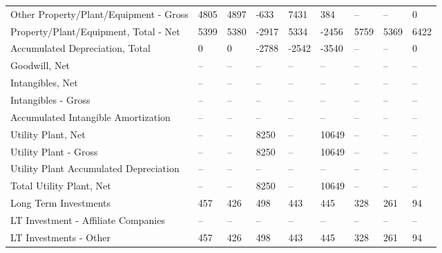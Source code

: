 \documentclass[grad,numbers]{coppe}
\begin{document}
\begin{longtable}[t]{lllllllll}
  \hspace{1em}\hspace{1em}Other Property/Plant/Equipment - Gross & 4805 & 4897 & -633 & 7431 & 384 & -- & -- & 0\\
  \hspace{1em}Property/Plant/Equipment, Total - Net & 5399 & 5380 & -2917 & 5334 & -2456 & 5759 & 5369 & 6422\\
  \hspace{1em}\hspace{1em}Accumulated Depreciation, Total & 0 & 0 & -2788 & -2542 & -3540 & -- & -- & 0\\
  \hspace{1em}Goodwill, Net & -- & -- & -- & -- & -- & -- & -- & --\\
  \hspace{1em}Intangibles, Net & -- & -- & -- & -- & -- & -- & -- & --\\
  \hspace{1em}\hspace{1em}Intangibles - Gross & -- & -- & -- & -- & -- & -- & -- & --\\
  \hspace{1em}\hspace{1em}Accumulated Intangible Amortization & -- & -- & -- & -- & -- & -- & -- & --\\
  \hspace{1em}Utility Plant, Net & -- & -- & 8250 & -- & 10649 & -- & -- & --\\
  \hspace{1em}\hspace{1em}Utility Plant - Gross & -- & -- & 8250 & -- & 10649 & -- & -- & --\\
  \hspace{1em}\hspace{1em}Utility Plant Accumulated Depreciation & -- & -- & -- & -- & -- & -- & -- & --\\
  \hspace{1em}Total Utility Plant, Net & -- & -- & 8250 & -- & 10649 & -- & -- & --\\
  \hspace{1em}Long Term Investments & 457 & 426 & 498 & 443 & 445 & 328 & 261 & 94\\
  \hspace{1em}\hspace{1em}LT Investment - Affiliate Companies & -- & -- & -- & -- & -- & -- & -- & --\\
  \hspace{1em}\hspace{1em}LT Investments - Other & 457 & 426 & 498 & 443 & 445 & 328 & 261 & 94\\

\end{longtable}
\end{document}
